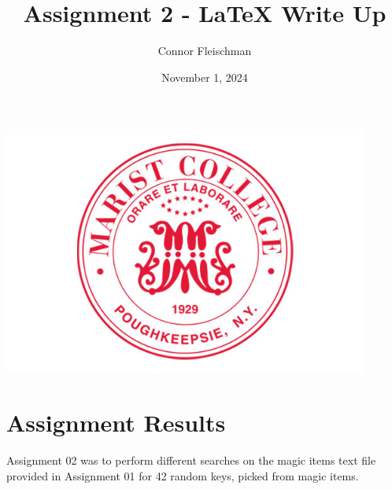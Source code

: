 \documentclass[12pt, letterpaper]{article}
\title{Assignment 2 - LaTeX Write Up}
\author{Connor Fleischman}
\date{November 1, 2024}
\begin{document}
\maketitle
\begin{center}
   \includegraphics[width=120mm,scale=0.5]{MaristSeal.png}
\end{center}
\newpage

\section{Assignment Results}
Assignment 02 was to perform different searches on the magic items text file provided in Assignment 01 for 42 random keys, picked from magic items.
\end{document}
